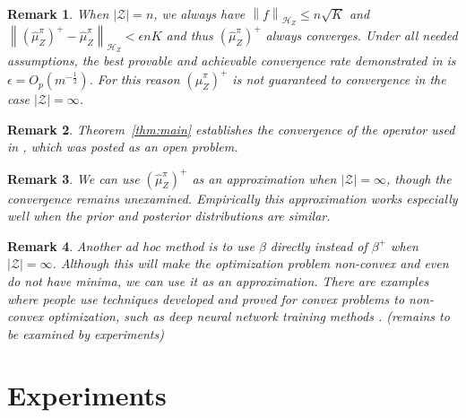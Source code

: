 \documentclass[a4paper]{article}
\renewcommand{\cal}{\mathcal}
\newcommand{\norm}[1]{\left\lVert#1\right\rVert}
\newtheorem{remark}{Remark}
\newcommand{\thmref}[1]{Theorem~\ref{#1}}
\begin{document}
\begin{remark}
When $|\cal{Z}| = n$, we always have $\norm{f}_{\cal{H}_Z} \leq n\sqrt{K}$ and $\norm{(\widehat{\mu}_Z^\pi)^+ - \widehat{\mu}_Z^\pi}_{\cal{H}_Z} < \epsilon n K$ and thus $(\widehat{\mu}_Z^\pi)^+$ always converges. Under all needed assumptions, the best provable and achievable convergence rate demonstrated in \cite{fukumizu2011kernel} is $\epsilon = O_p(m^{-\frac{1}{2}})$. For this reason $(\widehat{\mu}_Z^\pi)^+$ is not guaranteed to convergence in the case $|\cal{Z}| = \infty$.
\end{remark}
\begin{remark}
\thmref{thm:main} establishes the convergence of the operator used in \cite{nishiyama2012hilbert}, which was posted as an open problem.
\end{remark}
\begin{remark}
We can use $(\widehat{\mu}_Z^\pi)^+$ as an approximation when $|\cal{Z}| = \infty$, though the convergence remains unexamined. Empirically this approximation works especially well when the prior and posterior distributions are similar.
\end{remark}
\begin{remark}
Another ad hoc method is to use $\beta$ directly instead of $\beta^+$ when $|\cal{Z}| = \infty$. Although this will make the optimization problem non-convex and even do not have minima, we can use it as an approximation. There are examples where people use techniques developed and proved for convex problems to non-convex optimization, such as deep neural network training methods \cite{nesterov1983method}\cite{duchi2011adaptive}. ({\color{red}remains to be examined by experiments})
\end{remark}
\section{Experiments}
\end{document}
